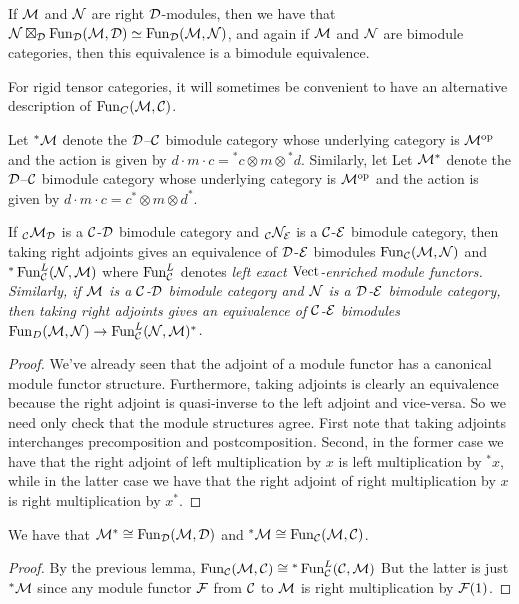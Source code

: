 \documentclass{amsart}
\begin{document}
\begin{remark} \label{remark-tensorasfunctors}
If $\mathcal M$ and $\mathcal N$ are right $\mathcal D$-modules, then we have that $\mathcal N \boxtimes_\mathcal D \operatorname{Fun}_{\mathcal D}(\mathcal M,\mathcal D) \simeq \operatorname{Fun}_{\mathcal D}(\mathcal M,\mathcal N)$, and again if $\mathcal M$ and $\mathcal N$ are bimodule categories, then this equivalence is a bimodule equivalence. 
\end{remark}



For rigid tensor categories, it will sometimes be convenient to have an alternative description of $\operatorname{Fun}_C(\mathcal M,\mathcal C)$.

\begin{definition}
Let ${}^*\mathcal M$ denote the $\mathcal D$--$\mathcal C$ bimodule category whose underlying category is $\mathcal M^{\mathrm{op}}$ and the action is given by $d\cdot m \cdot c = {}^*c \otimes m \otimes {}^*d$.  Similarly, let Let $\mathcal M^*$ denote the $\mathcal D$--$\mathcal C$ bimodule category whose underlying category is $\mathcal M^{\mathrm{op}}$ and the action is given by $d\cdot m \cdot c = c^* \otimes m \otimes d^*$.  
\end{definition}

\begin{lemma}
If ${}_{\mathcal C}\mathcal M_\mathcal D$ is a $\mathcal C$-$\mathcal D$ bimodule category and ${}_{\mathcal C}\mathcal N_\mathcal E$ is a $\mathcal C$-$\mathcal E$ bimodule category, then taking right adjoints gives an equivalence of $\mathcal D$-$\mathcal E$ bimodules $\operatorname{Fun}_{\mathcal C}(\mathcal M, \mathcal N)$ and ${}^*\operatorname{Fun}^L_{\mathcal C}(\mathcal N, \mathcal M)$ where $\operatorname{Fun}^L_\mathcal C$ denotes \em{left exact} $\mathrm{Vect}$-enriched module functors.  Similarly, if $\mathcal M$ is a $\mathcal C$-$\mathcal D$ bimodule category and $\mathcal N$ is a $\mathcal D$-$\mathcal E$ bimodule category, then taking right adjoints gives an equivalence of $\mathcal C$-$\mathcal E$ bimodules $\operatorname{Fun}_{D}(\mathcal M, \mathcal N) \rightarrow \operatorname{Fun}^L_{\mathcal C}(\mathcal N, \mathcal M)^*$. 
\end{lemma}
\begin{proof}
We've already seen that the adjoint of a module functor has a canonical module functor structure.  Furthermore, taking adjoints is clearly an equivalence because the right adjoint is quasi-inverse to the left adjoint and vice-versa.  So we need only check that the module structures agree.  First note that taking adjoints interchanges precomposition and postcomposition.  Second, in the former case we have that the right adjoint of left multiplication by $x$ is left multiplication by ${}^*x$, while in the latter case we have that the right adjoint of right multiplication by $x$ is right multiplication by $x^*$.
\end{proof}

\begin{lemma} \label{lem:dual-formula-for-adjoints}
We have that $\mathcal M^* \cong \operatorname{Fun}_{\mathcal D}(\mathcal M, \mathcal D)$ and ${}^*\mathcal M \cong \operatorname{Fun}_{\mathcal C}(\mathcal M, \mathcal C)$.
\end{lemma}
\begin{proof}
By the previous lemma, $\operatorname{Fun}_{\mathcal C}(\mathcal M, \mathcal C) \cong {}^*\operatorname{Fun}_{\mathcal C}^L(\mathcal C, \mathcal M)$  But the latter is just ${}^*\mathcal M$ since any module functor $\mathcal F$ from $\mathcal C$ to $\mathcal M$ is right multiplication by $\mathcal F(1)$.
\end{proof}
\end{document}
